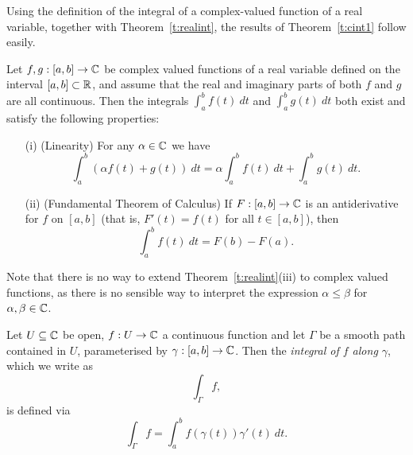 \begin{comment}
\begin{example}
Consider the function \[ g:\R \to \C, g(t) = t + i \cos (t). \]  Let us compute
\[
\int_2^3 g(t)\ dt.
\]
\vspace{5cm}
\end{example}
\end{comment}
Using the definition of the integral of a complex-valued function of a real variable, together with Theorem~\ref{t:realint}, the results of Theorem~\ref{t:cint1} follow easily.

\begin{theorem}
\label{t:cint1}
Let $f,g:[a,b] \to \mathbb{C}$ be complex valued functions of a real variable defined on the interval $[a,b] \subset \mathbb{R}$, and assume that the real and imaginary parts of both $f$ and $g$ are all continuous.  Then the integrals $\int_a^b f(t)\ dt$ and $\int_a^b g(t)\ dt$ both exist and satisfy the following properties:
\begin{enumerate}
\item[(i)] (Linearity) For any $\alpha \in \mathbb{C}$ we have
\[
\int_a^b \left( \alpha f(t) +  g(t) \right)\ dt = \alpha \int_a^b f(t)\ dt +  \int_a^b g(t)\ dt.
\]
\item[(ii)] (Fundamental Theorem of Calculus) If $F:[a,b] \to \mathbb{C}$ is an antiderivative for $f$ on $[a,b]$ (that is, $F'(t) = f(t)$ for all $t \in [a,b]$), then 
\[
\int_a^b f(t)\ dt = F(b) - F(a).
\]
\end{enumerate}
\end{theorem}
Note that there is no way to extend Theorem~\ref{t:realint}(iii) to complex valued functions, as there is no sensible way to interpret the expression $\alpha \leq \beta $ for $\alpha, \beta \in \mathbb{C}$.


\begin{definition}
Let $U \subseteq \mathbb{C}$ be open, $f:U \to \mathbb{C}$ a continuous function and let $\Gamma$ be a smooth path contained in $U$, parameterised by $\gamma :[a,b] \to \mathbb{C}$.  Then the \emph{integral of $f$ along $\gamma$}, which we write as 
\[
\int_{\Gamma} f,
\]
is defined via
\begin{equation}
\label{e:pathint}
\int_{\Gamma} f = \int_a^b f \left( \gamma(t) \right) \gamma ' (t)\ dt.
\end{equation}
\end{definition}

